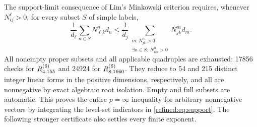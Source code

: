 The support-limit consequence of Lim's Minkowski criterion requires, whenever $N_{ij}^{\ell}>0$, for every subset $S$ of simple labels,
\begin{equation}\label{refined:eq:support}
 \frac1{d_\ell}\sum_{n\in S}N_{\ell k}^{n}d_n
 \le \frac1{d_j}\sum_{\substack{m:N_{jk}^{m}>0\\
                  \exists n\in S:\ N_{im}^{n}>0}}N_{jk}^{m}d_m.
\end{equation}
All nonempty proper subsets and all applicable quadruples are exhausted: 17856 checks for $R^{(6)}_{4,155}$ and 24924 for $R^{(6)}_{8,1660}$. They reduce to 54 and 215 distinct integer linear forms in the positive dimensions, respectively, and all are nonnegative by exact algebraic root isolation. Empty and full subsets are automatic. This proves the entire $p=\infty$ inequality for arbitrary nonnegative vectors by integrating the level-set indicators in \eqref{refined:eq:support}. The following stronger certificate also settles every finite exponent.

